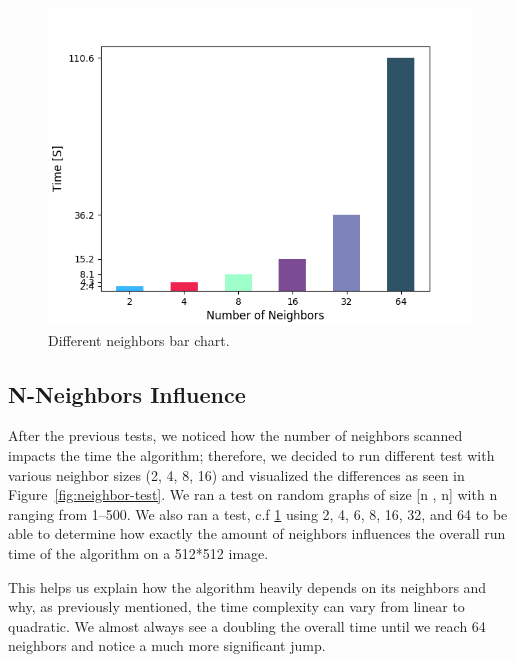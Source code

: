\documentclass{article}
\begin{document}
\begin{figure}[ht]
    \centering
    \includegraphics[width=\linewidth]{neighbor-chartbar.png}
    \caption{Different neighbors bar chart.}
    \label{fig:neighbor-chartbar}
\end{figure}

\subsection{N-Neighbors Influence}
\begin{flushleft}
After the previous tests, we noticed how the number of neighbors scanned impacts the time the algorithm; therefore, we decided to run different test with various neighbor sizes (2, 4, 8, 16) and visualized the differences as seen in  Figure~\ref{fig:neighbor-test}. We ran a test on random graphs of size [n , n] with n ranging from \numrange[range-phrase = -- = --]{1}{500}. We also ran a test, c.f \ref{fig:neighbor-chartbar} using 2, 4, 6, 8, 16, 32, and 64 to be able to determine how exactly the amount of neighbors influences the overall run time of the algorithm on a 512*512 image.

This helps us explain how the algorithm heavily depends on its neighbors and why, as previously mentioned, the time complexity can vary from linear to quadratic. We almost always see a doubling the overall time until we reach 64 neighbors and notice a much more significant jump.
\end{flushleft}
\end{document}
